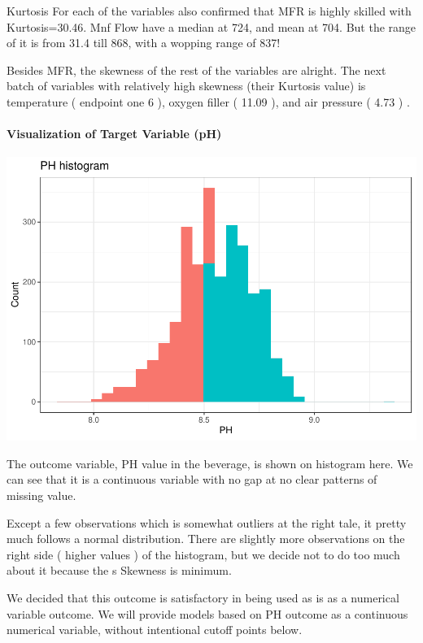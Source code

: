 \documentclass[]{article}
\let\oldparagraph\paragraph
\renewcommand{\paragraph}[1]{\oldparagraph{#1}\mbox{}}
\begin{document}
Kurtosis For each of the variables also confirmed that MFR is highly
skilled with Kurtosis=30.46. Mnf Flow have a median at 724, and mean at
704. But the range of it is from 31.4 till 868, with a wopping range of
837!

Besides MFR, the skewness of the rest of the variables are alright. The
next batch of variables with relatively high skewness (their Kurtosis
value) is temperature ( endpoint one 6 ), oxygen filler ( 11.09 ), and
air pressure ( 4.73 ) .

\paragraph{Visualization of Target Variable
(pH)}\label{visualization-of-target-variable-ph}

\begin{center}\includegraphics{OmerOzeren_GracieHan_Project_2_files/figure-latex/unnamed-chunk-6-1} \end{center}

The outcome variable, PH value in the beverage, is shown on histogram
here. We can see that it is a continuous variable with no gap at no
clear patterns of missing value.

Except a few observations which is somewhat outliers at the right tale,
it pretty much follows a normal distribution. There are slightly more
observations on the right side ( higher values ) of the histogram, but
we decide not to do too much about it because the s Skewness is minimum.

We decided that this outcome is satisfactory in being used as is as a
numerical variable outcome. We will provide models based on PH outcome
as a continuous numerical variable, without intentional cutoff points
below.
\end{document}
